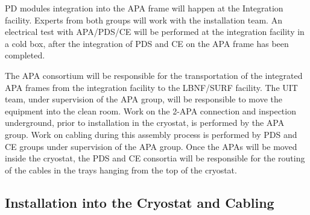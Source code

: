 
PD modules integration into the APA frame will happen at the Integration facility. Experts from both groups will work with the installation team. 
An electrical test with APA/PDS/CE will be performed at the integration facility in a cold box, after the integration of PDS and CE on the APA frame has been completed.

The APA consortium will be responsible for the transportation of the integrated APA frames from the integration facility to the LBNF/SURF facility. 
The UIT team, under supervision of the APA group, will be responsible to move the equipment into the clean room. 
Work on the 2-APA connection and inspection underground, prior to installation in the cryostat, is performed by the APA group.
Work on cabling during this assembly process is performed by PDS and CE groups under supervision of the APA group.
Once the APAs will be moved inside the cryostat, the PDS and CE consortia will be responsible for the routing of the cables in the trays hanging from the top of the cryostat. 


\subsection{Installation into the Cryostat and Cabling}
\label{sec:fdsp-pd-install-pd-cryo}




